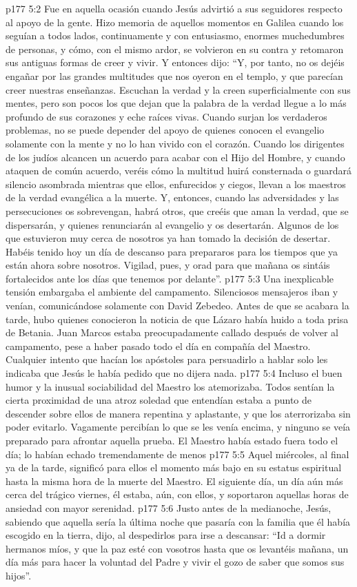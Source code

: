 \vs p177 5:2 Fue en aquella ocasión cuando Jesús advirtió a sus seguidores respecto al apoyo de la gente. Hizo memoria de aquellos momentos en Galilea cuando los seguían a todos lados, continuamente y con entusiasmo, enormes muchedumbres de personas, y cómo, con el mismo ardor, se volvieron en su contra y retomaron sus antiguas formas de creer y vivir. Y entonces dijo: “Y, por tanto, no os dejéis engañar por las grandes multitudes que nos oyeron en el templo, y que parecían creer nuestras enseñanzas. Escuchan la verdad y la creen superficialmente con sus mentes, pero son pocos los que dejan que la palabra de la verdad llegue a lo más profundo de sus corazones y eche raíces vivas. Cuando surjan los verdaderos problemas, no se puede depender del apoyo de quienes conocen el evangelio solamente con la mente y no lo han vivido con el corazón. Cuando los dirigentes de los judíos alcancen un acuerdo para acabar con el Hijo del Hombre, y cuando ataquen de común acuerdo, veréis cómo la multitud huirá consternada o guardará silencio asombrada mientras que ellos, enfurecidos y ciegos, llevan a los maestros de la verdad evangélica a la muerte. Y, entonces, cuando las adversidades y las persecuciones os sobrevengan, habrá otros, que creéis que aman la verdad, que se dispersarán, y quienes renunciarán al evangelio y os desertarán. Algunos de los que estuvieron muy cerca de nosotros ya han tomado la decisión de desertar. Habéis tenido hoy un día de descanso para prepararos para los tiempos que ya están ahora sobre nosotros. Vigilad, pues, y orad para que mañana os sintáis fortalecidos ante los días que tenemos por delante”.
\vs p177 5:3 Una inexplicable tensión embargaba el ambiente del campamento. Silenciosos mensajeros iban y venían, comunicándose solamente con David Zebedeo. Antes de que se acabara la tarde, hubo quienes conocieron la noticia de que Lázaro había huido a toda prisa de Betania. Juan Marcos estaba preocupadamente callado después de volver al campamento, pese a haber pasado todo el día en compañía del Maestro. Cualquier intento que hacían los apóstoles para persuadirlo a hablar solo les indicaba que Jesús le había pedido que no dijera nada.
\vs p177 5:4 Incluso el buen humor y la inusual sociabilidad del Maestro los atemorizaba. Todos sentían la cierta proximidad de una atroz soledad que entendían estaba a punto de descender sobre ellos de manera repentina y aplastante, y que los aterrorizaba sin poder evitarlo. Vagamente percibían lo que se les venía encima, y ninguno se veía preparado para afrontar aquella prueba. El Maestro había estado fuera todo el día; lo habían echado tremendamente de menos
\vs p177 5:5 Aquel miércoles, al final ya de la tarde, significó para ellos el momento más bajo en su estatus espiritual hasta la misma hora de la muerte del Maestro. El siguiente día, un día aún más cerca del trágico viernes, él estaba, aún, con ellos, y soportaron aquellas horas de ansiedad con mayor serenidad.
\vs p177 5:6 Justo antes de la medianoche, Jesús, sabiendo que aquella sería la última noche que pasaría con la familia que él había escogido en la tierra, dijo, al despedirlos para irse a descansar: “Id a dormir hermanos míos, y que la paz esté con vosotros hasta que os levantéis mañana, un día más para hacer la voluntad del Padre y vivir el gozo de saber que somos sus hijos”.
